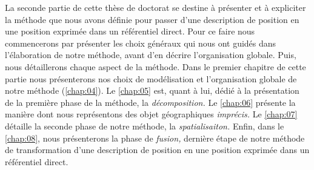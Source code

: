 La seconde partie de cette thèse de doctorat se destine à présenter et
à expliciter la méthode que nous avons définie pour passer d'une
description de position en une position exprimée dans un référentiel
direct. Pour ce faire nous commencerons par présenter les choix
généraux qui nous ont guidés dans l'élaboration de notre méthode,
avant d'en décrire l'organisation globale. Puis, nous détaillerons
chaque aspect de la méthode. Dans le premier chapitre de cette partie
nous présenterons nos choix de modélisation et l'organisation globale
de notre méthode (\autoref{chap:04}). Le \autoref{chap:05} est, quant
à lui, dédié à la présentation de la première phase de la méthode, la
\emph{décomposition.} Le \autoref{chap:06} présente la manière dont
nous représentons des objet géographiques \emph{imprécis.} Le
\autoref{chap:07} détaille la seconde phase de notre méthode, la
\emph{spatialisaiton.} Enfin, dans le \autoref{chap:08}, nous
présenterons la phase de \emph{fusion,} dernière étape de notre
méthode de transformation d'une description de position en une
position exprimée dans un référentiel direct.
